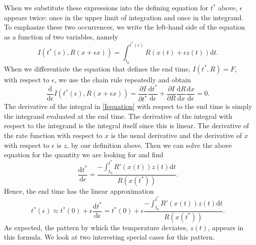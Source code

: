 \documentclass[12 pt]{article}
\begin{document}
When we substitute these expressions into the defining equation for $t^*$ above, $\epsilon$ appears twice: once in the upper limit of integration and once in the integrand. To emphasize these two occurrences, we write the left-hand side of the equation as a function of two variables, namely
\begin{equation} \label{Iequation}
    I(t^*(\epsilon),R(x+\epsilon x)) = \int _{t_0} ^{t^*(\epsilon)} R(x(t)+\epsilon z(t)) \mathrm{d}t. \tag*{Eq. S\theequation}
\end{equation}
When we differentiate the equation that defines the end time, $I(t^* ,R)=F$, with respect to $\epsilon$, we use the chain rule repeatedly and obtain
\begin{equation} 
    \frac{\mathrm{d}}{\mathrm{d}\epsilon}I(t^*(\epsilon),R(x+\epsilon x)) = \frac{\partial I}{\partial t^*} \frac{\mathrm{d}t^*}{\mathrm{d}\epsilon}+\frac{\partial I}{\partial R} \frac{\mathrm{d} R}{\mathrm{d} x} \frac{\mathrm{d}x}{\mathrm{d}\epsilon} = 0. \tag*{Eq. S\theequation}
\end{equation}
The derivative of the integral in \ref{Iequation} with respect to the end time is simply the integrand evaluated at the end time. The derivative of the integral with respect to the integrand is the integral itself since this is linear. The derivative of the rate function with respect to $x$ is the usual derivative and the derivative of $x$ with respect to $\epsilon$ is $z$, by our definition above. Then we can solve the above equation for the quantity we are looking for and find
\begin{equation} \label{dtdepsilon}
    \frac{\mathrm{d}t^*}{\mathrm{d}\epsilon}=\frac{- \int _{t_0} ^{t^*} R'(x(t)) z(t) \mathrm{d}t}{R(x(t^*))}. \tag*{Eq. S\theequation}
\end{equation}
Hence, the end time has the linear approximation
\begin{equation}
    t^*(\epsilon) \approx t^*(0)+\epsilon \frac{\mathrm{d}t^*}{\mathrm{d}\epsilon}=t^*(0)+\epsilon \frac{- \int _{t_0} ^{t^*} R'(x(t)) z(t) \mathrm{d}t}{R(x(t^*))}. \tag*{Eq. S\theequation}
\end{equation}
As expected, the pattern by which the temperature deviates, $z(t)$, appears in this formula. We look at two interesting special cases for this pattern. \par
\end{document}
